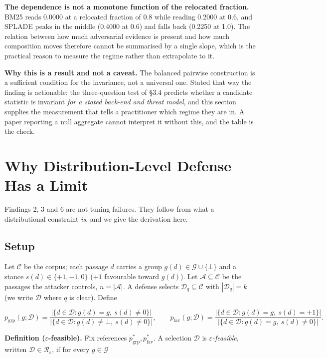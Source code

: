 \documentclass[authoryear,review,3p,times]{elsarticle}
\begin{document}
\textbf{The dependence is not a monotone function of the relocated fraction.} BM25 reads 0.0000 at a relocated fraction of 0.8 while reading 0.2000 at 0.6, and SPLADE peaks in the middle (0.4000 at 0.6) and falls back (0.2250 at 1.0). The relation between how much adversarial evidence is present and how much composition moves therefore cannot be summarised by a single slope, which is the practical reason to measure the regime rather than extrapolate to it.

\textbf{Why this is a result and not a caveat.} The balanced pairwise construction is a sufficient condition for the invariance, not a universal one. Stated that way the finding is actionable: the three-question test of §3.4 predicts whether a candidate statistic is invariant \emph{for a stated back-end and threat model}, and this section supplies the measurement that tells a practitioner which regime they are in. A paper reporting a null aggregate cannot interpret it without this, and the table is the check.

\section{Why Distribution-Level Defense Has a Limit}\label{why-distribution-level-defense-has-a-limit}

Findings 2, 3 and 6 are not tuning failures. They follow from what a distributional constraint \emph{is}, and we give the derivation here.

\subsection{Setup}\label{setup}

Let \(\mathcal{C}\) be the corpus; each passage \(d\) carries a group \(g(d) \in \mathcal{G} \cup \{\bot\}\) and a stance \(s(d) \in \{+1,-1,0\}\) (\(+1\) favourable toward \(g(d)\)). Let \(\mathcal{A} \subseteq \mathcal{C}\) be the passages the attacker controls, \(n = |\mathcal{A}|\). A defense selects \(\mathcal{D}_q \subseteq \mathcal{C}\) with \(|\mathcal{D}_q| = k\) (we write \(\mathcal{D}\) where \(q\) is clear). Define

\[p_{\text{grp}}(g;\mathcal{D}) = \frac{|\{d \in \mathcal{D} : g(d) = g,\ s(d)\neq 0\}|}{|\{d \in \mathcal{D} : g(d)\neq\bot,\ s(d)\neq 0\}|}, \qquad p_{\text{fav}}(g;\mathcal{D}) = \frac{|\{d \in \mathcal{D} : g(d) = g,\ s(d)=+1\}|}{|\{d \in \mathcal{D} : g(d) = g,\ s(d)\neq 0\}|}.\]

\textbf{Definition (\(\varepsilon\)-feasible).} Fix references \(p^{*}_{\text{grp}}, p^{*}_{\text{fav}}\). A selection \(\mathcal{D}\) is \emph{\(\varepsilon\)-feasible}, written \(\mathcal{D} \in \mathcal{R}_\varepsilon\), if for every \(g \in \mathcal{G}\)
\end{document}
